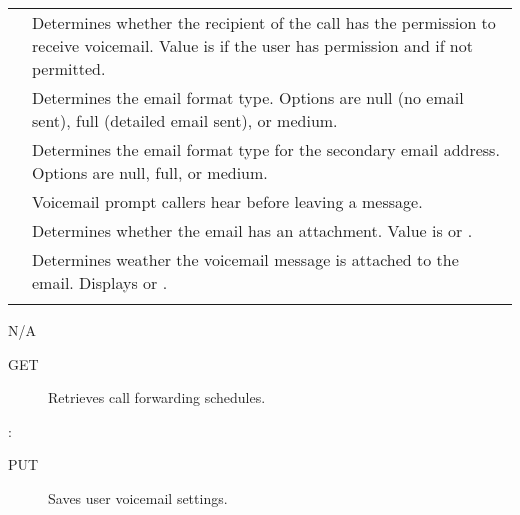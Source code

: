 \documentclass[letterpaper,10pt,english]{sphinxmanual}
\begin{document}
\begin{savenotes}\sphinxattablestart
\centering
\begin{tabulary}{\linewidth}[t]{|T|T|}
\hline

&
\\
\hline
{}
&
Determines whether the recipient of the call has the permission to receive voicemail. Value is  if the user has permission and  if not permitted.
\\
\hline
{}
&
Determines the email format type. Options are null (no email sent), full (detailed email sent), or medium.
\\
\hline
{}
&
Determines the email format type for the secondary email address. Options are null, full, or medium.
\\
\hline
{}
&
Voicemail prompt callers hear before leaving a message.
\\
\hline
{}
&
Determines whether the email has an attachment. Value is  or .
\\
\hline
{}
&
Determines weather the voicemail message is attached to the email. Displays  or .
\\
\hline
{}
&\\
\hline
\end{tabulary}
\par
\sphinxattableend\end{savenotes}

 N/A
\begin{description}
\item[{ GET}] \leavevmode
Retrieves call forwarding schedules.

\end{description}

:

\begin{sphinxVerbatim}[commandchars=\\\{\}]
\end{sphinxVerbatim}
\begin{description}
\item[{ PUT}] \leavevmode
Saves user voicemail settings.

\end{description}
\end{document}
